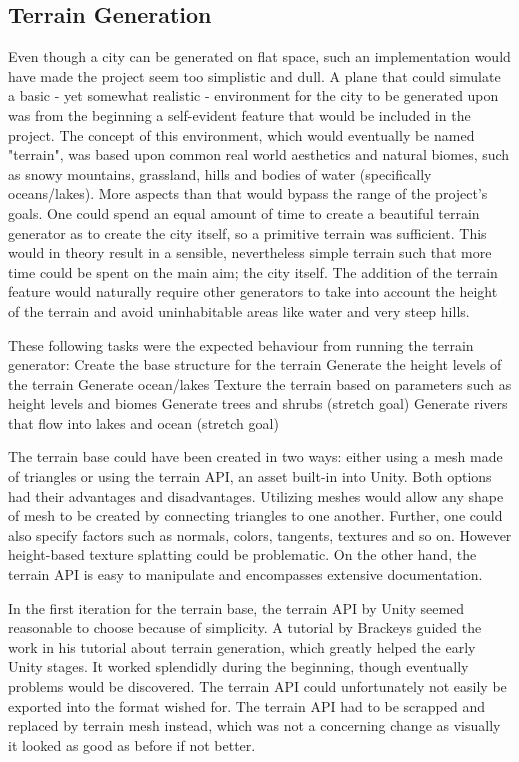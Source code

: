 \subsection{Terrain Generation}

Even though a city can be generated on flat space, such an implementation would have made the project seem too simplistic and dull.
A plane that could simulate a basic - yet somewhat realistic - environment for the city to be generated upon was from the beginning a self-evident feature that would be included in the project. 
The concept of this environment, which would eventually be named "terrain", was based upon common real world aesthetics and natural biomes, such as snowy mountains, grassland, hills and bodies of water (specifically oceans/lakes).
More aspects than that would bypass the range of the project’s goals.
One could spend an equal amount of time to create a beautiful terrain generator as to create the city itself, so a primitive terrain was sufficient.
This would in theory result in a sensible, nevertheless simple terrain such that more time could be spent on the main aim; the city itself.
The addition of the terrain feature would naturally require other generators to take into account the height of the terrain and avoid uninhabitable areas like water and very steep hills. 

These following tasks were the expected behaviour from running the terrain generator:
Create the base structure for the terrain
Generate the height levels of the terrain
Generate ocean/lakes
Texture the terrain based on parameters such as height levels and biomes
Generate trees and shrubs (stretch goal)
Generate rivers that flow into lakes and ocean (stretch goal)

The terrain base could have been created in two ways: either using a mesh made of triangles or using the terrain API, an asset built-in into Unity.
Both options had their advantages and disadvantages.
Utilizing meshes would allow any shape of mesh to be created by connecting triangles to one another.
Further, one could also specify factors such as normals, colors, tangents, textures and so on.
However height-based texture splatting could be problematic.
On the other hand, the terrain API is easy to manipulate and encompasses extensive documentation.

In the first iteration for the terrain base, the terrain API by Unity seemed reasonable to choose because of simplicity. A tutorial by Brackeys guided the work in his tutorial about terrain generation, which greatly helped the early Unity stages.
It worked splendidly during the beginning, though eventually problems would be discovered.
The terrain API could unfortunately not easily be exported into the format wished for.
The terrain API had to be scrapped and replaced by terrain mesh instead, which was not a concerning change as visually it looked as good as before if not better. 

